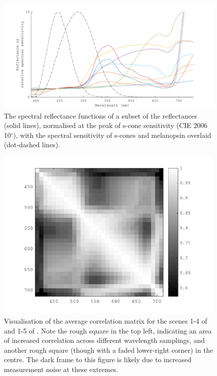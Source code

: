 \begin{figure}[htbp]
 \includegraphics[max width=\textwidth]{figs/comp/melcomp_2_caller/plateau.pdf}
 \caption{The spectral reflectance functions of a subset of the \citet{vrhel_measurement_1994} reflectances (solid lines), normalised at the peak of s-cone sensitivity (CIE 2006 10$^{\circ}$), with the spectral sensitivity of s-cones and melanopsin \citep{lucas_measuring_2014} overlaid (dot-dashed lines).}
 \label{fig:plateau}
\end{figure} 

\begin{figure}[htbp]
 \includegraphics[max width=\textwidth]{figs/comp/nat_cor/foster.pdf}
 \caption{Visualisation of the average correlation matrix for the scenes 1-4 of \citep{nascimento_statistics_2002} and 1-5 of \citep{foster_frequency_2006}. Note the rough square in the top left, indicating an area of increased correlation across different wavelength samplings, and another rough square (though with a faded lower-right corner) in the centre. The dark frame to this figure is likely due to increased measurement noise at these extremes.}
 \label{fig:foster}
\end{figure} %

